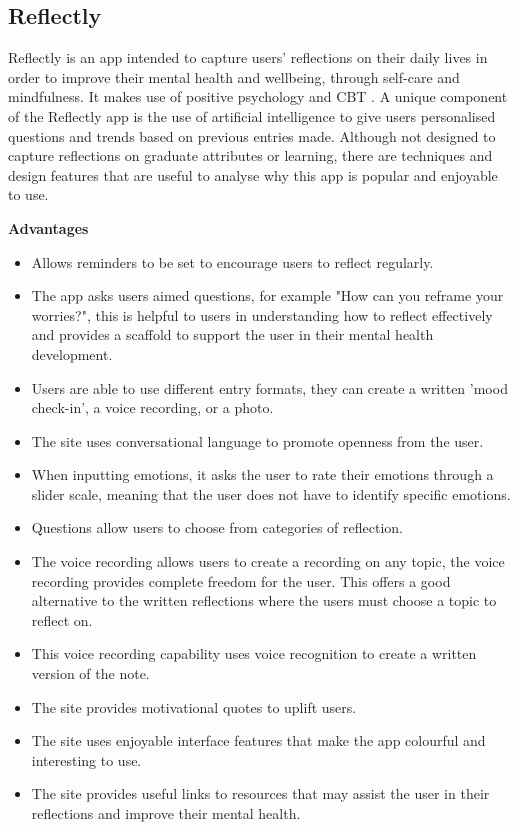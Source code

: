 \documentclass{l4proj}
\begin{document}
\subsection{Reflectly}

Reflectly is an app intended to capture users’ reflections on their daily lives in order to improve their mental health and wellbeing, through self-care and mindfulness. It makes use of positive psychology and CBT \citep{reflectly_app}. A unique component of the Reflectly app is the use of artificial intelligence to give users personalised questions and trends based on previous entries made. Although not designed to capture reflections on graduate attributes or learning, there are techniques and design features that are useful to analyse why this app is popular and enjoyable to use. 

\textbf{Advantages}
\begin{itemize}
    \item Allows reminders to be set to encourage users to reflect regularly.
    \item The app asks users aimed questions, for example "How can you reframe your worries?", this is helpful to users in understanding how to reflect effectively and provides a scaffold to support the user in their mental health development.
    \item Users are able to use different entry formats, they can create a written 'mood check-in', a voice recording, or a photo.
    \item The site uses conversational language to promote openness from the user.
    \item When inputting emotions, it asks the user to rate their emotions through a slider scale, meaning that the user does not have to identify specific emotions. 
    \item Questions allow users to choose from categories of reflection.
    \item The voice recording allows users to create a recording on any topic, the voice recording provides complete freedom for the user. This offers a good alternative to the written reflections where the users must choose a topic to reflect on.
    \item This voice recording capability uses voice recognition to create a written version of the note.
    \item The site provides motivational quotes to uplift users.
    \item The site uses enjoyable interface features that make the app colourful and interesting to use.
    \item The site provides useful links to resources that may assist the user in their reflections and improve their mental health.
\end{itemize}
\end{document}
